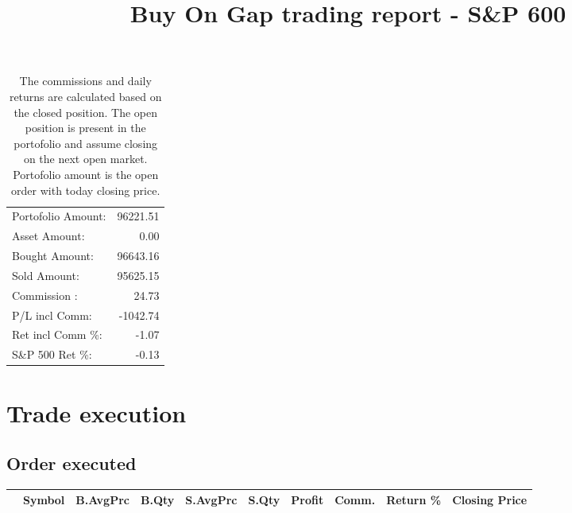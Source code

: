 \documentclass{tufte-handout}\usepackage[]{graphicx}\usepackage[]{color}
\begin{document}
\begin{table}[ht]
\begin{tabular}{lr}
   \hline
Portofolio Amount: & 96221.51 \\ 
  Asset Amount: & 0.00 \\ 
  Bought Amount: & 96643.16 \\ 
  Sold   Amount: & 95625.15 \\ 
  Commission   : & 24.73 \\ 
  P/L incl Comm: & -1042.74 \\ 
  Ret incl Comm \%: & -1.07 \\ 
  S\&P 500 Ret \%: & -0.13 \\ 
   \hline
\end{tabular}
\caption{The commissions and daily returns are calculated based on the closed position.
The open position is present in the portofolio and assume closing on the next open market.
Portofolio amount is the open order with today closing price.} 
\end{table}



% 
% 


\title{Buy On Gap trading report - S\&P 600}
\maketitle

\section{Trade execution}
\subsection{Order executed}


\begin{table}[ht]
\centering
\begin{tabular}{llrrrrrrr|r}
  \hline
 & Symbol & B.AvgPrc & B.Qty & S.AvgPrc & S.Qty & Profit & Comm. & Return \% & Closing Price \\ 
  \hline
\hline
\end{tabular}
\end{table}
\end{document}
